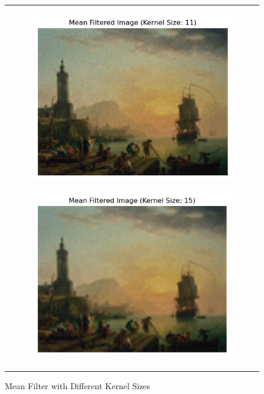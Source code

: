 \documentclass[hidelinks,12pt]{article}
\begin{document}
\begin{figure}[!h]
\begin{tabular}{c}
			\begin{subfigure}[h]{0.5\textwidth}
				\centering
				\includegraphics[width=\textwidth]{figures/mean_filter/k_11.png}
			\end{subfigure}
			\hfill
			\begin{subfigure}[h]{0.5\textwidth}
				\centering
				\includegraphics[width=\textwidth]{figures/mean_filter/k_15.png}
			\end{subfigure}
		\end{tabular}
		\caption{Mean Filter with Different Kernel Sizes}
	\end{figure}
	
\end{document}
